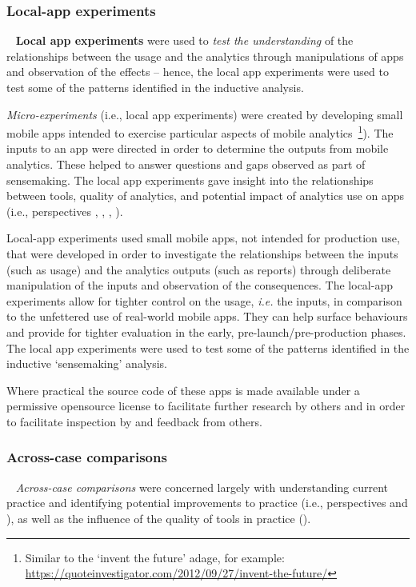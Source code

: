 \subsubsection{Local-app experiments}~\label{local-app-experiments-research-method} 
\textbf{Local app experiments} were used to \textit{test the understanding} of the relationships between the usage and the analytics through manipulations of apps and observation of the effects -- hence, the local app experiments were used to test some of the patterns identified in the inductive analysis.

\textit{Micro-experiments} (i.e., local app experiments) were created by developing small mobile apps intended to exercise particular aspects of mobile analytics~\footnote{Similar to the `invent the future' adage, for example: \url{https://quoteinvestigator.com/2012/09/27/invent-the-future/}}). The inputs to an app were directed in order to determine the outputs from mobile analytics. These helped to answer questions and gaps observed as part of sensemaking.  The local app experiments gave insight into the relationships between tools, quality of analytics, and potential impact of analytics use on apps (i.e., perspectives \uartefacts, \utools, \iartefacts, \itools). 

Local-app experiments used small mobile apps, not intended for production use, that were developed in order to investigate the relationships between the inputs (such as usage) and the analytics outputs (such as reports) through deliberate manipulation of the inputs and observation of the consequences.  
 The local-app experiments allow for tighter control on the usage, \textit{i.e.} the inputs, in comparison to the unfettered use of real-world mobile apps. They can help surface behaviours and provide for tighter evaluation in the early, pre-launch/pre-production phases. %
The local app experiments were used to test some of the patterns identified in the inductive `sensemaking' analysis.

Where practical the source code of these apps is made available under a permissive opensource license to facilitate further research by others and in order to facilitate inspection by and feedback from others.



\subsubsection{Across-case comparisons}~\label{across-case-comparisons-research-method}
\textit{Across-case comparisons} were concerned largely with understanding current practice and identifying potential improvements to practice (i.e., perspectives \uuse and \iuse), as well as the influence of the quality of tools in practice (\itools).

